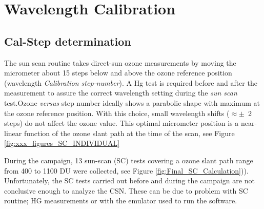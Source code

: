 




\section{Wavelength Calibration} \label{sec:WVL}

\subsection{Cal-Step determination} \label{subsec:CSN}
The sun scan routine takes direct-sun ozone measurements by moving the micrometer about 15 steps below and above the ozone reference position (wavelength \textit{Calibration step-number}). A Hg test is required before and after the measurement to assure the correct wavelength setting during the \emph{sun scan} test.Ozone \emph{versus} step number ideally shows a parabolic shape with maximum at the ozone reference position. With this choice, small wavelength shifts ($\approx \pm$\ 2 steps) do not affect the ozone value. This optimal micrometer position is a near-linear function of the ozone slant path at the time of the scan, see Figure \ref{fig:xxx_figures_SC_INDIVIDUAL}

During the campaign, 13 sun-scan (SC) tests covering a ozone slant path range from 400 to 1100 DU were collected, see Figure \ref{fig:Final_SC_Calculation})). Unfortunately, the SC tests carried out before and during the campaign are not conclusive enough to analyze the CSN. These can be due to problem with SC routine; HG measurements or with the emulator used to run the software. 


